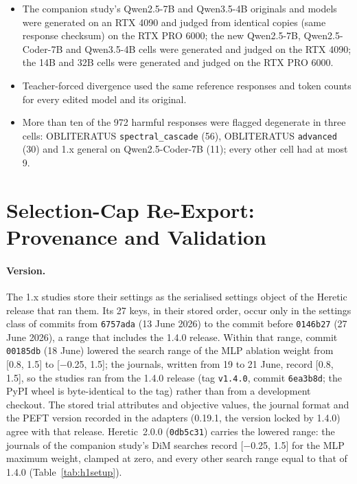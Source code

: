 \begin{itemize}
\item The companion study's Qwen2.5-7B and Qwen3.5-4B originals and models were generated on an RTX 4090 and judged
from identical copies (same response checksum) on the RTX PRO 6000; the new Qwen2.5-7B, Qwen2.5-Coder-7B and
Qwen3.5-4B cells were generated and judged on the RTX 4090; the 14B and 32B cells were generated and judged on the
RTX PRO 6000.
\item Teacher-forced divergence used the same reference responses and token counts for every edited model and its
original.
\item More than ten of the 972 harmful responses were flagged degenerate in three cells: OBLITERATUS
\texttt{spectral\_cascade} (56), OBLITERATUS \texttt{advanced} (30) and 1.x general on Qwen2.5-Coder-7B (11); every
other cell had at most 9.
\end{itemize}

\section{Selection-Cap Re-Export: Provenance and Validation}
\label{app:reexport}

\paragraph{Version.} The 1.x studies store their settings as the serialised settings object of the Heretic release
that ran them. Its 27 keys, in their stored order, occur only in the settings class of commits from \texttt{6757ada}
(13 June 2026) to the commit before \texttt{0146b27} (27 June 2026), a range that includes the 1.4.0 release.
Within that range, commit \texttt{00185db} (18 June) lowered the search range of the MLP ablation weight from
[0.8, 1.5] to [$-$0.25, 1.5]; the journals, written from 19 to 21 June, record [0.8, 1.5], so the studies ran from
the 1.4.0 release (tag \texttt{v1.4.0}, commit \texttt{6ea3b8d}; the PyPI wheel is byte-identical to the tag) rather
than from a development checkout. The stored trial attributes and objective values, the journal format and the PEFT
version recorded in the adapters (0.19.1, the version locked by 1.4.0) agree with that release. Heretic~2.0.0
(\texttt{0db5c31}) carries the lowered range: the journals of the companion study's DiM searches record
[$-$0.25, 1.5] for the MLP maximum weight, clamped at zero, and every other search range equal to that of 1.4.0
(Table~\ref{tab:h1setup}).

